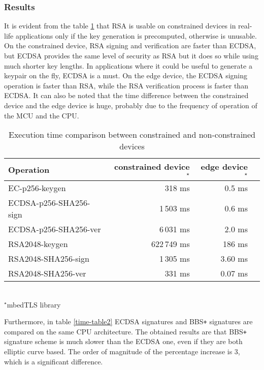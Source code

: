 \subsubsection*{Results}
It is evident from the table \ref{time-table1} that RSA is usable on constrained devices in real-life applications only if the key generation is precomputed, otherwise is unusable. On the constrained device, RSA signing and verification are faster than ECDSA, but ECDSA provides the same level of security as RSA but it does so while using much shorter key lengths. In applications where it could be useful to generate a keypair on the fly, ECDSA is a must. On the edge device, the ECDSA signing operation is faster than RSA, while the RSA verification process is faster than ECDSA.  It can also be noted that the time difference between the constrained device and the edge device is huge, probably due to the frequency of operation of the MCU and the CPU.

\begin{table}[!h]
    \centering
    \begin{tabular}{| l || r | r | r |}
        \hline      
        \textbf{Operation} & \textbf{constrained device}$^\star$ & \textbf{edge device}$^\star$ \\ [0.5ex] 
        \hline \hline 
        EC-p256-keygen                  & 318 ms  & 0.5 ms \\
        \hline
        ECDSA-p256-SHA256-sign          & 1\,503 ms & 0.6 ms \\
        \hline
        ECDSA-p256-SHA256-ver           & 6\,031 ms & 2.0 ms \\
        \hline \hline
        RSA2048-keygen                  & 622\,749 ms  & 186  ms \\
        \hline
        RSA2048-SHA256-sign          & 1\,305 ms & 3.60 ms \\
        \hline
        RSA2048-SHA256-ver           & 331 ms & 0.07  ms \\
        \hline
    \end{tabular}\\
    \footnotesize $^\star$mbedTLS library
    \caption{Execution time comparison between constrained and non-constrained devices}
    \label{time-table1}
\end{table}

Furthermore, in table \ref{time-table2} ECDSA signatures and BBS\texttt{+} signatures are compared on the same CPU architecture. The obtained results are that BBS\texttt{+} signature scheme is much slower than the ECDSA one, even if they are both elliptic curve based. The order of magnitude of the percentage increase is 3, which is a significant difference. 
   
